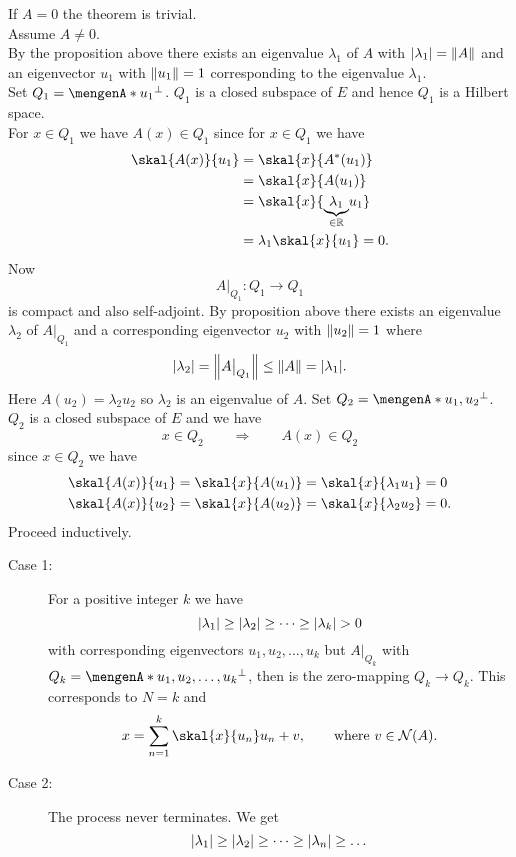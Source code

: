 \begin{beweis}
	If $A=0$ the theorem is trivial. \\ Assume $A \neq 0$. \\
	By the proposition above there exists an eigenvalue $\lambda_1$ of $A$ with $\abs{\lambda_1}= \norm{A}$ and an eigenvector $u_1$ with 
	$\norm{u_1}=1$ corresponding to the eigenvalue $\lambda_1$. \\
	Set $Q_1 = \set{u_1}^{\perp}$. $Q_1$ is a closed subspace of $E$ and hence $Q_1$ is a Hilbert space. \\
	For $x \in Q_1$ we have $A(x) \in Q_1$ since for $x \in Q_1$ we have
	\begin{align*}
		\skal{A(x)}{u_1} &= \skal{x}{A^*(u_1)}  \\ &= \skal{x}{A(u_1)} \\&= \skal{x}{\underset{\in  \mathbb{R}}{\underbrace{\lambda_1}} u_1} \\
		&= \lambda_1 \skal{x}{u_1} = 0.
	\end{align*}
	Now
	\[
		A  \big|_{Q_1}^{} : Q_1 \to Q_1
	\]
	is compact and also self-adjoint. By proposition above there exists an eigenvalue $\lambda_2$ of $A  \big|_{Q_1}^{}$ and a corresponding eigenvector $u_2$ with $\norm{u_2}=1$ where
	\[
		\abs{\lambda_2} = \norm{A  \big|_{Q_1}^{}} \leq \norm{A} = \abs{ \lambda_1}.
	\]
	Here $A(u_2) = \lambda_2 u_2$ so $\lambda_2$ is an eigenvalue of $A$. Set $Q_2 = \set{u_1,u_2}^{\perp}$. $Q_2$ is a closed subspace of $E$ and we have
	\[
		x \in Q_2 \qquad \Rightarrow \qquad A(x) \in Q_2 
	\]
	since $x \in Q_2$ we have
	\begin{align*}
		\skal{A(x)}{u_1} &= \skal{x}{A(u_1)} = \skal{x}{\lambda_1 u_1} = 0 \\
		\skal{A(x)}{u_2} &= \skal{x}{A(u_2)} = \skal{x}{\lambda_2 u_2} = 0.
	\end{align*}
	Proceed inductively.
	\begin{description}
		\item[Case 1:] For a positive integer $k$ we have 
		\[
			\lvert\lambda_1\rvert \geq  \lvert\lambda_2\rvert \geq  \dots \geq  \lvert\lambda_k\rvert>0
		\]
		with corresponding eigenvectors $u_1,u_2, \dots,u_k$ but $A  \big|_{Q_k}^{}$ with $Q_k = \set{u_1,u_2,\dots,u_k}^{\perp}$, then is the zero-mapping $Q_k \to Q_k$. This corresponds to $N=k$ and 
		\[
			x = \sum_{n=1}^{k} \skal{x}{u_n}u_n + v, \qquad \text{where }v \in \mathcal{N}(A).
		\]
		\item[Case 2:] The process never terminates. We get 
		\[
			\lvert\lambda_1\rvert \geq \lvert\lambda_2\rvert \geq \dots \geq \lvert\lambda_n\rvert \geq \dots
\]
\end{description}
\end{beweis}
